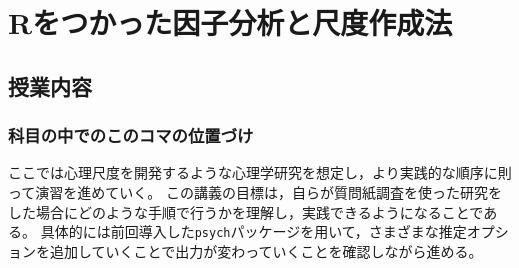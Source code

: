 \section{Rをつかった因子分析と尺度作成法}
\subsection{授業内容}
\subsubsection{科目の中でのこのコマの位置づけ}
ここでは心理尺度を開発するような心理学研究を想定し，より実践的な順序に則って演習を進めていく。
この講義の目標は，自らが質問紙調査を使った研究をした場合にどのような手順で行うかを理解し，実践できるようになることである。
具体的には前回導入した\texttt{psych}パッケージを用いて，さまざまな推定オプションを追加していくことで出力が変わっていくことを確認しながら進める。

